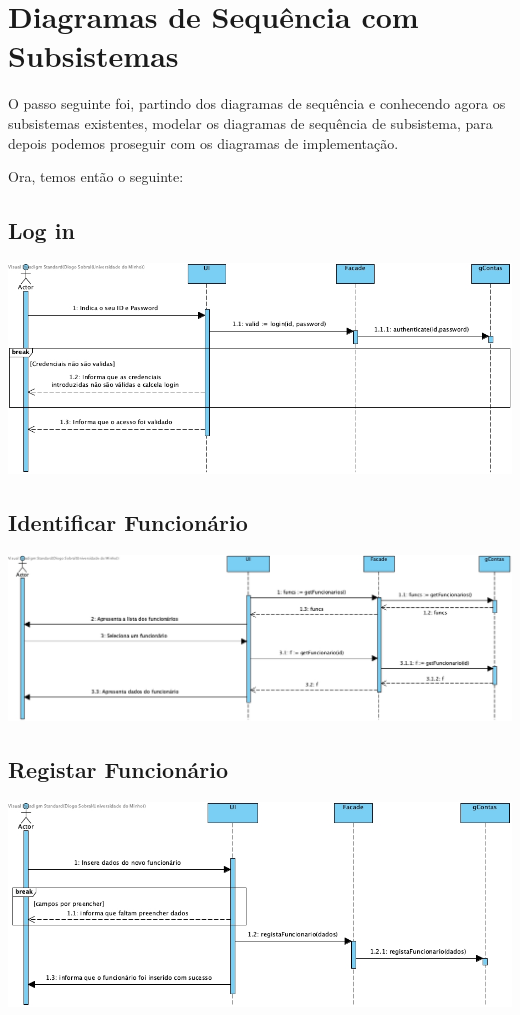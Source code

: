 \section{Diagramas de Sequência com Subsistemas}
O passo seguinte foi, partindo dos diagramas de sequência e conhecendo agora os subsistemas existentes, modelar os diagramas de sequência de subsistema, para depois podemos proseguir com os diagramas de implementação.

Ora, temos então o seguinte:

\subsection{Log in}
\begin{center}
 	\includegraphics[width = 5.5in]{DSSS/DSSS-LogIn.jpg}
\end{center}

\subsection{Identificar Funcionário}
\begin{center}
 	\includegraphics[width = 5.5in]{DSSS/DSSS-Identificar_Funcionario.jpg}
\end{center}

\subsection{Registar Funcionário}
\begin{center}
 	\includegraphics[width = 5.5in]{DSSS/DSSS-Registar_Funcionario.jpg}
\end{center}

